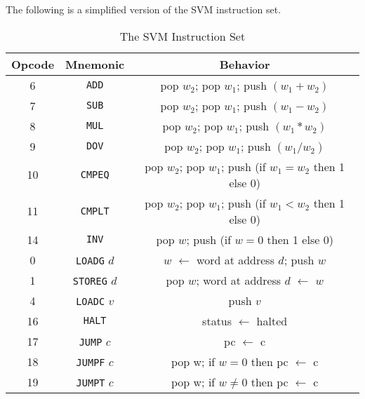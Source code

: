 \documentclass[a4paper, openany]{memoir}
\begin{document}
The following is a simplified version of the SVM instruction set.
\begin{table}[H]
    \centering
    \begin{tabular}{|c|c|c|}
        \hline
        Opcode & Mnemonic & Behavior \\
        \hline
        6 & \texttt{ADD} & pop $w_2$; pop $w_1$; push $(w_1 + w_2)$ \\
        7 & \texttt{SUB} & pop $w_2$; pop $w_1$; push $(w_1 - w_2)$ \\
        8 & \texttt{MUL} & pop $w_2$; pop $w_1$; push $(w_1 * w_2)$ \\
        9 & \texttt{DOV} & pop $w_2$; pop $w_1$; push $(w_1 / w_2)$ \\
        10 & \texttt{CMPEQ} & pop $w_2$; pop $w_1$; push (if $w_1 = w_2$ then 1 else 0) \\
        11 & \texttt{CMPLT} & pop $w_2$; pop $w_1$; push (if $w_1 < w_2$ then 1 else 0) \\
        14 & \texttt{INV} & pop $w$; push (if $w=0$ then 1 else 0) \\
        0 & \texttt{LOADG} $d$ & $w$ $\leftarrow$ word at address $d$; push $w$ \\
        1 & \texttt{STOREG} $d$ & pop $w$; word at address $d$ $\leftarrow$ $w$ \\
        4 & \texttt{LOADC} $v$ & push $v$ \\
        16 & \texttt{HALT}  & status $\leftarrow$ halted \\
        17 & \texttt{JUMP} $c$ & pc $\leftarrow$ c \\
        18 & \texttt{JUMPF} $c$ & pop w; if $w = 0$ then pc $\leftarrow$ c \\
        19 & \texttt{JUMPT} $c$ & pop w; if $w \neq 0$ then pc $\leftarrow$ c \\
        \hline
    \end{tabular}
    \caption{The SVM Instruction Set}
\end{table}
\end{document}
